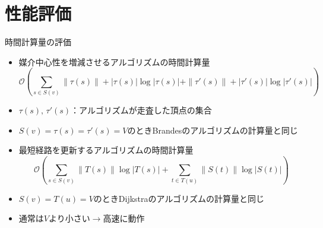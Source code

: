 \documentclass[dvipdfmx,fleqn]{beamer}
\begin{document}
\section{性能評価}
\begin{frame}{時間計算量の評価}
  \begin{itemize}\small
    \item 媒介中心性を増減させるアルゴリズムの時間計算量
    \begin{equation*}
      \mathcal{O}\left(\sum_{s\in S(v)}\|\tau(s)\|+|\tau(s)|\log|\tau(s)|+\|\tau'(s)\|+|\tau'(s)|\log|\tau'(s)|\right)
    \end{equation*}
  \item[] $\tau(s),\,\tau'(s)$：アルゴリズムが走査した頂点の集合
  \item[] \alert{$S(v)=\tau(s)=\tau'(s)=V$}のときBrandesのアルゴリズムの計算量と同じ
    \item 最短経路を更新するアルゴリズムの時間計算量
    \begin{equation*}
      \mathcal{O}\left(\sum_{s\in S(v)}\|T(s)\|\log|T(s)|+\sum_{t\in T(u)}\|S(t)\|\log|S(t)|\right)
    \end{equation*}
  \item[] \alert{$S(v)=T(u)=V$}のときDijkstraのアルゴリズムの計算量と同じ
  \item 通常は$V$より小さい$\rightarrow$\alert{高速に動作}
  \end{itemize}
\end{frame}
\end{document}

